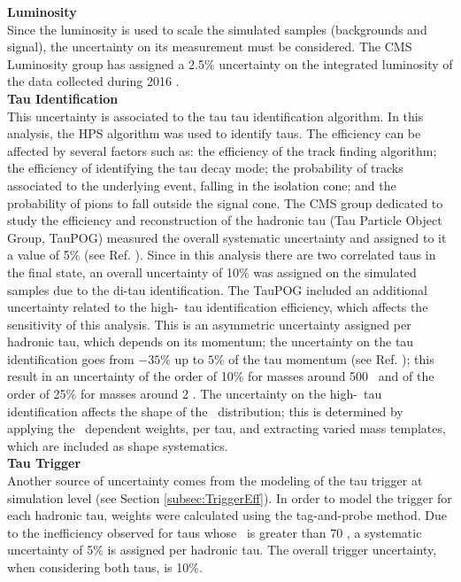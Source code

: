 \textbf{Luminosity}\\

\noindent Since the luminosity is used to scale the simulated samples
(backgrounds and signal), the uncertainty on its measurement must be considered. The 
CMS Luminosity group has assigned a 2.5$\%$ uncertainty on the integrated luminosity of the 
data collected during 2016 \cite{Luminosity}.\\
 
\textbf{Tau Identification}\\

\noindent This uncertainty is associated to the tau 
tau identification algorithm. In this analysis, the HPS algorithm 
was used to identify taus. The efficiency can be 
affected by several factors such as: the efficiency
of the track finding algorithm; the efficiency of
identifying the tau decay mode; the probability of tracks associated 
to the underlying event, falling in the isolation cone; and
the probability of pions to fall outside the signal cone. The CMS group
dedicated to study the efficiency and reconstruction of 
the hadronic tau (Tau Particle Object Group, TauPOG) measured 
the overall systematic uncertainty and assigned to 
it a value of 5$\%$ (see Ref. \cite{TauPOG}). Since in this analysis
there are two correlated taus in the final state, an overall uncertainty 
of 10$\%$ was assigned on the simulated samples due to 
the di-tau identification. The TauPOG included an additional
uncertainty related to the high-\pt~tau identification efficiency, which 
affects the sensitivity of this analysis. This is an asymmetric 
uncertainty assigned per hadronic tau, which depends on its momentum; 
the uncertainty on the tau identification goes from $-35\%$ up to $5\%$ of 
the tau momentum (see Ref. \cite{TauPOG}); this result in an uncertainty 
of the order of 10$\%$ for masses around 500 \GeV~and of the order of 25$\%$ 
for masses around 2 \TeV. The uncertainty on the high-\pt~tau identification 
affects the shape of the \mass~distribution; this is determined by 
applying the \pt~dependent weights, per tau, and extracting 
varied mass templates, which are included as shape systematics.\\

\textbf{Tau Trigger}\\

\noindent Another source of uncertainty comes from the modeling
of the tau trigger at simulation level (see 
Section \ref{subsec:TriggerEff}). In order to model 
the trigger for each hadronic tau, weights were 
calculated using the tag-and-probe method. Due to the inefficiency observed for taus 
whose \pt~is greater than 70 \GeV, a systematic uncertainty of 5$\%$ is assigned per 
hadronic tau. The overall trigger uncertainty, when considering both taus, is 10$\%$.\\

